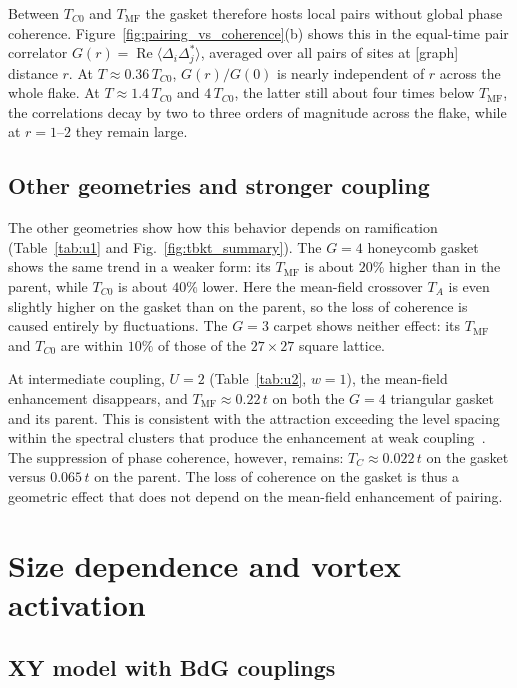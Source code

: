 \documentclass[aps,prb,twocolumn,superscriptaddress,floatfix]{revtex4-2}
\newcommand{\Tmf}{T_{\mathrm{MF}}}
\begin{document}
Between $T_{C0}$ and $\Tmf$ the gasket therefore hosts local pairs without
global phase coherence. Figure~\ref{fig:pairing_vs_coherence}(b) shows this in
the equal-time pair correlator $G(r) = \operatorname{Re}\langle \Delta_i
\Delta_j^*\rangle$, averaged over all pairs of sites at [graph] distance $r$.
At $T \approx 0.36\,T_{C0}$, $G(r)/G(0)$ is nearly independent of $r$ across
the whole flake. At $T \approx 1.4\,T_{C0}$ and $4\,T_{C0}$, the latter still
about four times below $\Tmf$, the correlations decay by two to three orders of
magnitude across the flake, while at $r = 1$--$2$ they remain large.

\subsection{Other geometries and stronger coupling}

The other geometries show how this behavior depends on ramification
(Table~\ref{tab:u1} and Fig.~\ref{fig:tbkt_summary}). The $G=4$ honeycomb
gasket shows the same trend in a weaker form: its $\Tmf$ is about $20\%$
higher than in the parent, while $T_{C0}$ is about $40\%$ lower. Here the
mean-field crossover $T_A$ is even slightly higher on the gasket than on the
parent, so the loss of coherence is caused entirely by fluctuations. The
$G=3$ carpet shows neither effect: its $\Tmf$ and $T_{C0}$ are within $10\%$
of those of the $27\times 27$ square lattice.

At intermediate coupling, $U = 2$ (Table~\ref{tab:u2}, $w = 1$), the
mean-field enhancement disappears, and $\Tmf \approx 0.22\,t$ on both the
$G=4$ triangular gasket and its parent. This is consistent with the
attraction exceeding the level spacing within the spectral clusters that
produce the enhancement at weak coupling~\cite{Iliasov2024}. The suppression
of phase coherence, however, remains: $T_C \approx 0.022\,t$ on the gasket
versus $0.065\,t$ on the parent. The loss of coherence on the gasket is thus a
geometric effect that does not depend on the mean-field enhancement of
pairing.

\section{Size dependence and vortex activation}
\label{sec:scaling}

\subsection{XY model with BdG couplings}
\end{document}
